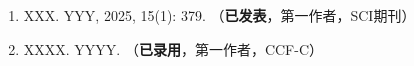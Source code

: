\begin{publications}
\begin{enumerate}

\item 
XXX. YYY, 2025, 15(1): 379. （\textbf{已发表}，第一作者，SCI期刊）
 
\item  
XXXX. YYYY. （\textbf{已录用}，第一作者，CCF-C）  
\end{enumerate}
\end{publications}

